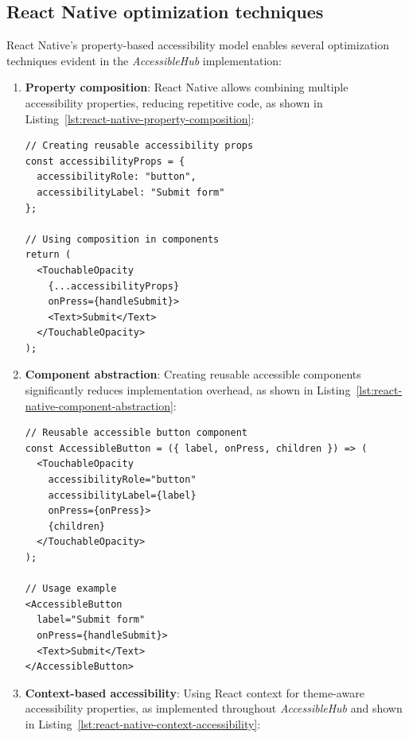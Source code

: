 \subsection{React Native optimization techniques}
\label{subsec:react-native-optimization}

React Native's property-based accessibility model enables several optimization techniques evident in the \textit{AccessibleHub} implementation:

\begin{enumerate}
    \item \textbf{Property composition}: React Native allows combining multiple accessibility properties, reducing repetitive code, as shown in Listing~\ref{lst:react-native-property-composition}:
    
    \begin{lstlisting}[style=ReactNativeStyle, caption=Property composition in React Native, label=lst:react-native-property-composition]
// Creating reusable accessibility props
const accessibilityProps = {
  accessibilityRole: "button",
  accessibilityLabel: "Submit form"
};

// Using composition in components
return (
  <TouchableOpacity
    {...accessibilityProps}
    onPress={handleSubmit}>
    <Text>Submit</Text>
  </TouchableOpacity>
);
    \end{lstlisting}
    
    \item \textbf{Component abstraction}: Creating reusable accessible components significantly reduces implementation overhead, as shown in Listing~\ref{lst:react-native-component-abstraction}:
    
    \begin{lstlisting}[style=ReactNativeStyle, caption=Component abstraction in React Native, label=lst:react-native-component-abstraction]
// Reusable accessible button component
const AccessibleButton = ({ label, onPress, children }) => (
  <TouchableOpacity
    accessibilityRole="button"
    accessibilityLabel={label}
    onPress={onPress}>
    {children}
  </TouchableOpacity>
);

// Usage example
<AccessibleButton
  label="Submit form"
  onPress={handleSubmit}>
  <Text>Submit</Text>
</AccessibleButton>
    \end{lstlisting}
    
    \item \textbf{Context-based accessibility}: Using React context for theme-aware accessibility properties, as implemented throughout \textit{AccessibleHub} and shown in Listing~\ref{lst:react-native-context-accessibility}:
    

\end{enumerate}

